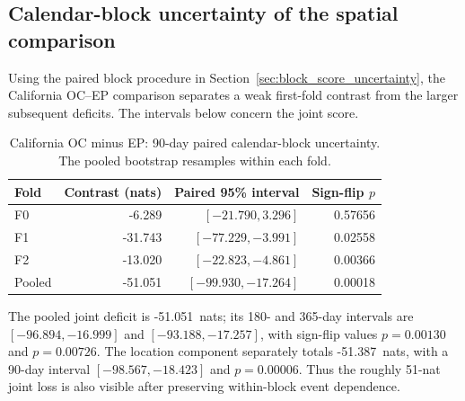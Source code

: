 \subsection{Calendar-block uncertainty of the spatial comparison}
Using the paired block procedure in Section~\ref{sec:block_score_uncertainty}, the California OC--EP
comparison separates a weak first-fold contrast from the larger subsequent
deficits. The intervals below concern the joint score.

\begin{table}[htbp]
\centering
\begin{tabular}{lrrr}
\toprule
Fold & Contrast (nats) & Paired 95\% interval & Sign-flip $p$ \\
\midrule
F0 & -6.289 & $[-21.790,3.296]$ & 0.57656 \\
F1 & -31.743 & $[-77.229,-3.991]$ & 0.02558 \\
F2 & -13.020 & $[-22.823,-4.861]$ & 0.00366 \\
\midrule
Pooled & -51.051 & $[-99.930,-17.264]$ & 0.00018 \\
\bottomrule
\end{tabular}
\caption{California OC minus EP: 90-day paired calendar-block uncertainty. The pooled bootstrap resamples within each fold.}
\label{tab:ca_oc_ep_uncertainty}
\end{table}

The pooled joint deficit is -51.051~nats; its 180- and 365-day intervals are $[-96.894,-16.999]$ and $[-93.188,-17.257]$, with sign-flip values $p=0.00130$ and $p=0.00726$. The location component separately totals -51.387~nats, with a 90-day interval $[-98.567,-18.423]$ and $p=0.00006$. Thus the roughly 51-nat joint loss is also visible after preserving within-block event dependence.
